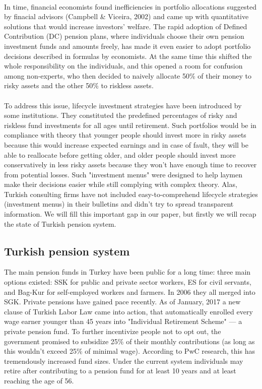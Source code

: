 \documentclass[review]{elsarticle}
\begin{document}
\paragraph*{}
In time, financial economists found inefficiencies in portfolio allocations suggested by finacial advisors (Campbell \& Viceira, 2002) and came up with quantitative solutions that would increase investors' welfare. The rapid adoption of Defined Contribution (DC) pension plans, where individuals choose their own pension investment funds and amounts freely, has made it even easier to adopt portfolio decisions described in formulas by economists. At the same time this shifted the whole responsibility on the individuals, and this opened a room for confusion among non-experts, who then decided to naively allocate 50\% of their money to risky assets and the other 50\% to riskless assets.
\paragraph*{} 
To address this issue, lifecycle investment strategies have been introduced by some institutions. They constituted the predefined percentages of risky and riskless fund investments for all ages until retirement. Such portfolios would be in compliance with theory that younger people should invest more in risky assets because this would increase expected earnings and in case of fault, they will be able to reallocate before getting older, and older people should invest more conservatively in less risky assets because they won't have enough time to recover from potential losses. Such "investment menus" were designed to help laymen make their decisions easier while still complying with complex theory. Alas, Turkish consulting firms have not included easy-to-comprehend lifecycle strategies (investment menus) in their bulletins and didn't try to spread transparent information. We will fill this important gap in our paper, but firstly we will recap the state of Turkish pension system.

\subsection{Turkish pension system}
The main pension funds in Turkey have been public for a long time: three main options existed: SSK for public and private sector workers, ES for civil servants, and Bag-Kur for self-employed workers and farmers. In 2006 they all merged into SGK. Private pensions have gained pace recently. As of January, 2017 a new clause of Turkish Labor Law came into action, that automatically enrolled every wage earner younger than 45 years into "Individual Retirement Scheme" --- a private pension fund. To further incentivize people not to opt out, the government promised to subsidize 25\% of their monthly contributions (as long as this wouldn't exceed 25\% of minimal wage). According to PwC research, this has tremendously increased fund sizes. Under the current system individuals may retire after contributing to a pension fund for at least 10 years and at least reaching the age of 56.
\end{document}
